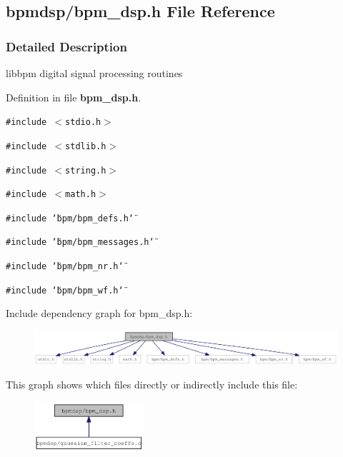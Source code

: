 \subsection{bpmdsp/bpm\_\-dsp.h File Reference}
\label{bpm__dsp_8h}


\subsubsection{Detailed Description}
libbpm digital signal processing routines 



Definition in file {\bf bpm\_\-dsp.h}.

{\tt \#include $<$stdio.h$>$}\par
{\tt \#include $<$stdlib.h$>$}\par
{\tt \#include $<$string.h$>$}\par
{\tt \#include $<$math.h$>$}\par
{\tt \#include \char`\"{}bpm/bpm\_\-defs.h\char`\"{}}\par
{\tt \#include \char`\"{}bpm/bpm\_\-messages.h\char`\"{}}\par
{\tt \#include \char`\"{}bpm/bpm\_\-nr.h\char`\"{}}\par
{\tt \#include \char`\"{}bpm/bpm\_\-wf.h\char`\"{}}\par


Include dependency graph for bpm\_\-dsp.h:\nopagebreak
\begin{figure}[H]
\begin{center}
\leavevmode
\includegraphics[width=409pt]{bpm__dsp_8h__incl}
\end{center}
\end{figure}


This graph shows which files directly or indirectly include this file:\nopagebreak
\begin{figure}[H]
\begin{center}
\leavevmode
\includegraphics[width=115pt]{bpm__dsp_8h__dep__incl}
\end{center}
\end{figure}
